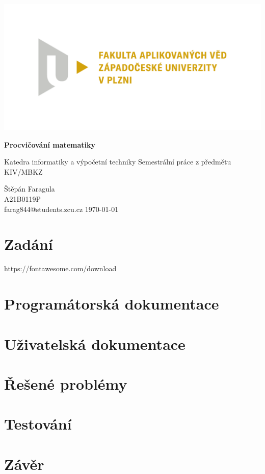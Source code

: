 \documentclass[12pt]{report}
\begin{document}
	\begin{titlepage}
		\centering
		\Large
		
		\includegraphics[width=.7\textwidth]{fav}
		
		\vspace{15mm}
		{\Huge\bfseries Procvičování matematiky}

		\vspace{5mm}
		{\LARGE Katedra informatiky a výpočetní techniky}
		{\LARGE Semestrální práce z předmětu KIV/MBKZ}
		
		\vfill
		\raggedright
		Štěpán Faragula\\
		A21B0119P\\
		farag844@students.zcu.cz
		\hfill 
		\today
	\end{titlepage}

	
	\tableofcontents


	\chapter{Zadání}		
	https://fontawesome.com/download

	\chapter{Programátorská dokumentace}


	\chapter{Uživatelská dokumentace}


	\chapter{Řešené problémy}


	\chapter{Testování}
	

	\chapter{Závěr}
	
\end{document}
